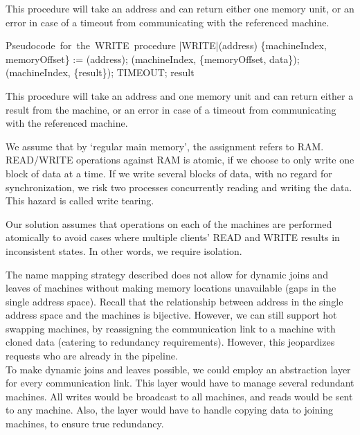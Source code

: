 \documentclass[11pt]{article}
\begin{document}
This procedure will take an address and can return either one memory unit, or an error in case of a timeout from communicating with the referenced machine.
    
\begin{program}
\mbox{Pseudocode for the WRITE procedure}
        \PROC |WRITE|(address) \BODY
               \{machineIndex, memoryOffset\} :=  (address);
                (machineIndex, \{memoryOffset, data\});
                \;  (machineIndex, \{result\});
               \; TIMEOUT;
                \; result \ENDPROC
\end{program}


This procedure will take an address and one memory unit and can return either a
result from the machine, or an error in case of a timeout from communicating
with the referenced machine.


We assume that by ‘regular main memory’, the assignment refers to RAM. READ/WRITE operations against RAM is atomic, if we choose to only write one block of data at a time. If we write several blocks of data, with no regard for synchronization, we risk two processes concurrently reading and writing the data. This hazard is called write tearing. 

Our solution assumes that operations on each of the machines are performed
atomically to avoid cases where multiple clients' READ and WRITE results in
inconsistent states. In other words, we require isolation.



The name mapping strategy described does not allow for dynamic joins and leaves
of machines without making memory locations unavailable (gaps in the single address
space). Recall that the relationship between address in the single address space
and the machines is bijective.
However, we can still support hot
swapping machines, by reassigning the communication link to a machine with cloned
data (catering to redundancy requirements). However, this jeopardizes requests who
are already in the pipeline.\\

To make dynamic joins and leaves possible, we could employ an abstraction layer for every communication link. This layer would have to manage several redundant machines. All writes would be broadcast to all machines, and reads would be sent to any machine. Also, the layer would have to handle copying data to joining machines, to ensure true redundancy. 
\end{document}

